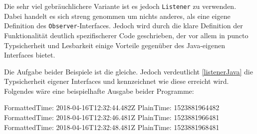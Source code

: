 
Die sehr viel gebräuchlichere Variante ist es jedoch \texttt{Listener} zu verwenden. Dabei handelt es sich streng genommen um nichts anderes, als eine eigene Definition des \texttt{Observer}-Interfaces. Jedoch wird durch die klare Definition der Funktionalität deutlich spezifischerer Code geschrieben, der vor allem in puncto Typsicherheit und Lesbarkeit einige Vorteile gegenüber des Java-eigenen Interfaces bietet.


Die Aufgabe beider Beispiele ist die gleiche. Jedoch verdeutlicht \autoref{listenerJava} die Typsicherheit eigener Interfaces und kennzeichnet wie diese erreicht wird. Folgendes wäre eine beispielhafte Ausgabe beider Programme:

\begin{shellwindow}
FormattedTime: 2018-04-16T12:32:44.482Z
PlainTime: 1523881964482
FormattedTime: 2018-04-16T12:32:46.481Z
PlainTime: 1523881966481
FormattedTime: 2018-04-16T12:32:48.481Z
PlainTime: 1523881968481
\end{shellwindow}